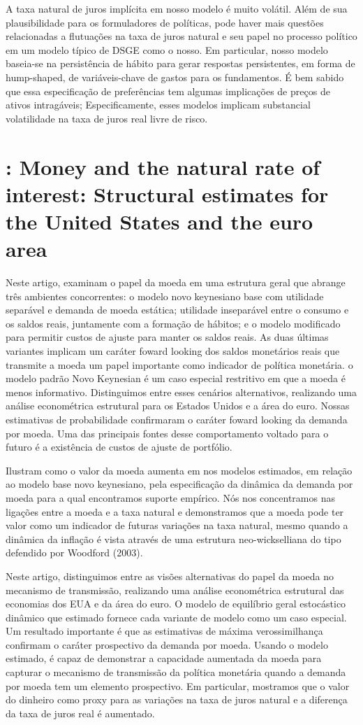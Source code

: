 \documentclass[11pt,oneside,a4paper]{article}
\begin{document}
A taxa natural de juros implícita em nosso modelo é muito volátil. Além de sua plausibilidade para os formuladores de políticas, pode haver mais questões relacionadas a flutuações na taxa de juros natural e seu papel no processo político em um modelo típico de DSGE como o nosso. Em particular, nosso modelo baseia-se na persistência de hábito para gerar respostas persistentes, em forma de hump-shaped, de variáveis-chave de gastos para os fundamentos. É bem sabido que essa especificação de preferências tem algumas implicações de preços de ativos intragáveis; Especificamente, esses modelos implicam substancial volatilidade na taxa de juros real livre de risco.
%
%
\section{\citet{Lopez-Salido:2009}: Money and the natural rate of interest: Structural estimates for the United States and the euro area }

Neste artigo, examinam o papel da moeda em uma estrutura geral que abrange três ambientes concorrentes: o modelo novo keynesiano  base com utilidade separável e demanda de moeda estática; utilidade inseparável entre o consumo e os saldos reais, juntamente com a formação de hábitos; e o modelo modificado para permitir custos de ajuste para manter os saldos reais. As duas últimas variantes implicam um caráter foward looking dos saldos monetários reais que transmite a moeda um papel importante como indicador de política monetária. o modelo padrão Novo Keynesian é um caso especial restritivo em que a moeda é menos informativo. Distinguimos entre esses cenários alternativos, realizando uma análise econométrica estrutural para os Estados Unidos e a área do euro. Nossas estimativas de probabilidade confirmaram o caráter foward looking da demanda por moeda. Uma das principais fontes desse comportamento voltado para o futuro é a existência de custos de ajuste de portfólio.

Ilustram como o valor da moeda aumenta em nos modelos estimados, em relação ao modelo base novo keynesiano, pela especificação da dinâmica da demanda por moeda para a qual encontramos suporte empírico. Nós nos concentramos nas ligações entre a moeda e a taxa natural e demonstramos que a moeda pode ter valor como um indicador de futuras variações na taxa natural, mesmo quando a dinâmica da inflação é vista através de uma estrutura neo-wickselliana do tipo defendido por Woodford (2003).

Neste artigo, distinguimos entre as visões alternativas do papel da moeda no mecanismo de transmissão, realizando uma análise econométrica estrutural das economias dos EUA e da área do euro. O modelo de equilíbrio geral estocástico dinâmico que estimado fornece cada variante de modelo  como um caso especial. Um resultado importante é que as estimativas de máxima verossimilhança confirmam o caráter prospectivo da demanda por moeda. Usando o modelo estimado, é capaz de demonstrar a capacidade aumentada da moeda para capturar o mecanismo de transmissão da política monetária quando a demanda por moeda tem um elemento prospectivo. Em particular, mostramos que o valor do dinheiro como proxy para as variações na taxa de juros natural e a diferença da taxa de juros real é aumentado.
\end{document}
